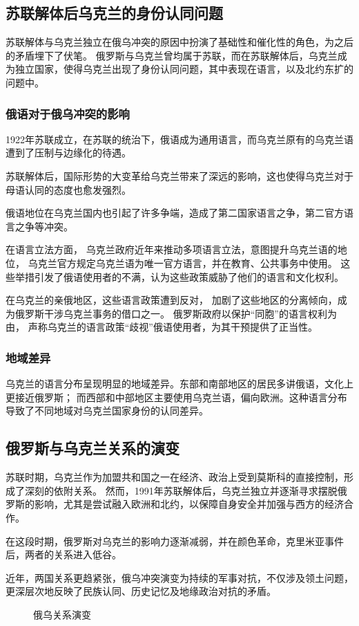 \subsection{苏联解体后乌克兰的身份认同问题}
苏联解体与乌克兰独立在俄乌冲突的原因中扮演了基础性和催化性的角色，为之后的矛盾埋下了伏笔。
俄罗斯与乌克兰曾均属于苏联，而在苏联解体后，乌克兰成为独立国家，使得乌克兰出现了身份认同问题，其中表现在语言，以及北约东扩的问题中。
\subsubsection{俄语对于俄乌冲突的影响}
1922年苏联成立，在苏联的统治下，俄语成为通用语言，而乌克兰原有的乌克兰语遭到了压制与边缘化的待遇。

苏联解体后，国际形势的大变革给乌克兰带来了深远的影响，这也使得乌克兰对于母语认同的态度也愈发强烈。

俄语地位在乌克兰国内也引起了许多争端，造成了第二国家语言之争，第二官方语言之争等冲突。\cite{__2023-1}

在语言立法方面，
乌克兰政府近年来推动多项语言立法，意图提升乌克兰语的地位，
乌克兰官方规定乌克兰语为唯一官方语言，并在教育、公共事务中使用。
这些举措引发了俄语使用者的不满，认为这些政策威胁了他们的语言和文化权利。

在乌克兰的亲俄地区，这些语言政策遭到反对，
加剧了这些地区的分离倾向，成为俄罗斯干涉乌克兰事务的借口之一。
俄罗斯政府以保护“同胞”的语言权利为由，
声称乌克兰的语言政策“歧视”俄语使用者，为其干预提供了正当性。

\subsubsection{地域差异}
乌克兰的语言分布呈现明显的地域差异。东部和南部地区的居民多讲俄语，文化上更接近俄罗斯；
而西部和中部地区主要使用乌克兰语，偏向欧洲。这种语言分布导致了不同地域对乌克兰国家身份的认同差异。

\subsection{俄罗斯与乌克兰关系的演变}
苏联时期，乌克兰作为加盟共和国之一在经济、政治上受到莫斯科的直接控制，形成了深刻的依附关系。
然而，1991年苏联解体后，乌克兰独立并逐渐寻求摆脱俄罗斯的影响，尤其是尝试融入欧洲和北约，以保障自身安全并加强与西方的经济合作。

在这段时期，俄罗斯对乌克兰的影响力逐渐减弱，并在颜色革命，克里米亚事件后，两者的关系进入低谷。

近年，两国关系更趋紧张，俄乌冲突演变为持续的军事对抗，不仅涉及领土问题，更深层次地反映了民族认同、历史记忆及地缘政治对抗的矛盾。
\begin{figure}[htbp]
    \centering
    \caption{俄乌关系演变}
\end{figure}
